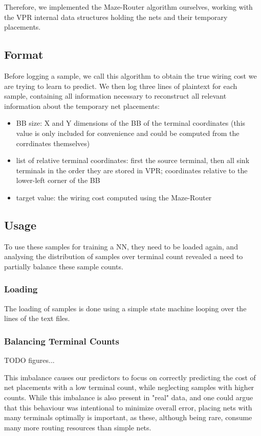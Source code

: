 Therefore, we implemented the Maze-Router algorithm ourselves, working with the \gls{VPR} internal data structures holding the nets and their temporary placements.

\subsection{Format}

Before logging a sample, we call this algorithm to obtain the true wiring cost we are trying to learn to predict. We then log three lines of plaintext for each sample, containing all information necessary to reconstruct all relevant information about the temporary net placements:

\begin{itemize}
	\item \gls{BB} size: X and Y dimensions of the \gls{BB} of the terminal coordinates (this value is only included for convenience and could be computed from the corrdinates themselves)
	\item list of relative terminal coordinates: first the source terminal, then all sink terminals in the order they are stored in \gls{VPR}; coordinates relative to the lower-left corner of the \gls{BB}
	\item target value: the wiring cost computed using the Maze-Router
\end{itemize}

\subsection{Usage}

To use these samples for training a \gls{NN}, they need to be loaded again, and analysing the distribution of samples over terminal count revealed a need to partially balance these sample counts.

\subsubsection{Loading}

The loading of samples is done using a simple state machine looping over the lines of the text files.

\subsubsection{Balancing Terminal Counts}

TODO figures...

This imbalance causes our predictors to focus on correctly predicting the cost of net placements with a low terminal count, while neglecting samples with higher counts. While this imbalance is also present in "real" data, and one could argue that this behaviour was intentional to minimize overall error, placing nets with many terminals optimally is important, as these, although being rare, consume many more routing resources than simple nets.

